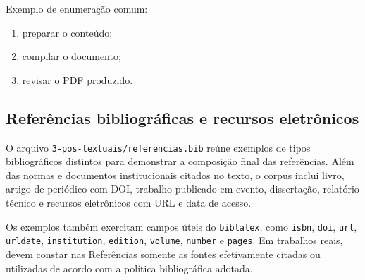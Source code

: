 Exemplo de enumeração comum:

\begin{enumerate}
  \item preparar o conteúdo;
  \item compilar o documento;
  \item revisar o PDF produzido.
\end{enumerate}

\subsection{Referências bibliográficas e recursos eletrônicos}

O arquivo \texttt{3-pos-textuais/referencias.bib} reúne exemplos de tipos bibliográficos distintos para demonstrar a composição final das referências. Além das normas e documentos institucionais citados no texto, o corpus inclui livro, artigo de periódico com DOI, trabalho publicado em evento, dissertação, relatório técnico e recursos eletrônicos com URL e data de acesso.

Os exemplos também exercitam campos úteis do \texttt{biblatex}, como \texttt{isbn}, \texttt{doi}, \texttt{url}, \texttt{urldate}, \texttt{institution}, \texttt{edition}, \texttt{volume}, \texttt{number} e \texttt{pages}. Em trabalhos reais, devem constar nas Referências somente as fontes efetivamente citadas ou utilizadas de acordo com a política bibliográfica adotada.

\nocite{lamport1994,wessberg2000,vaswani2017attention,almeida2018,rfc9110}
